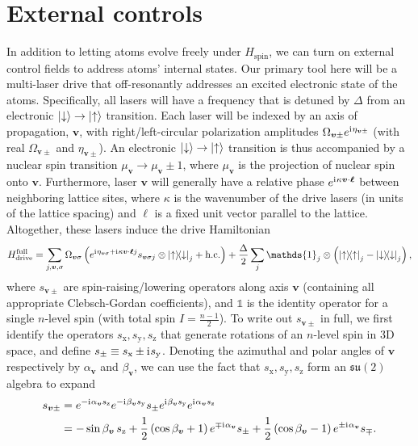 \documentclass[nofootinbib,notitlepage,11pt]{revtex4-2}
\renewcommand{\t}{\text} %
\newcommand{\f}[2]{\dfrac{#1}{#2}} %
\newcommand{\p}[1]{\left(#1\right)} %
\renewcommand{\v}{\bm} %
\renewcommand{\c}{\cdot} %
\renewcommand{\i}{\mathrm{i}\mkern1mu} %
\newcommand{\1}{\mathds{1}}
\newcommand{\up}{\uparrow}
\newcommand{\dn}{\downarrow}
\newcommand{\x}{\text{x}}
\newcommand{\y}{\text{y}}
\newcommand{\z}{\text{z}}
\newcommand{\su}{\mathfrak{su}}
\begin{document}
\section{External controls}
\label{sec:controls}

In addition to letting atoms evolve freely under $H_{\t{spin}}$, we can turn on external control fields to address atoms' internal states.
Our primary tool here will be a multi-laser drive that off-resonantly addresses an excited electronic state of the atoms.
Specifically, all lasers will have a frequency that is detuned by $\Delta$ from an electronic $\ket\dn\to\ket\up$ transition.
Each laser will be indexed by an axis of propagation, $\v v$, with right/left-circular polarization amplitudes $\Omega_{\v v\pm} e^{\i\eta_{\v v\pm}}$ (with real $\Omega_{\v v\pm}$ and $\eta_{\v v\pm}$).
An electronic $\ket\dn\to\ket\up$ transition is thus accompanied by a nuclear spin transition $\mu_{\v v}\to\mu_{\v v}\pm1$, where $\mu_{\v v}$ is the projection of nuclear spin onto $\v v$.
Furthermore, laser $\v v$ will generally have a relative phase $e^{\i\kappa\v v\c\v\ell}$ between neighboring lattice sites, where $\kappa$ is the wavenumber of the drive lasers (in units of the lattice spacing) and $\v\ell$ is a fixed unit vector parallel to the lattice.
Altogether, these lasers induce the drive Hamiltonian
\begin{align}
  H_{\t{drive}}^{\t{full}} = \sum_{j,\v v,\sigma}
  \Omega_{\v v\sigma} \p{e^{\i\eta_{\v v\sigma} + \i\kappa\v v\c\v\ell j}
    s_{\v v\sigma j} \otimes \op{\up}{\dn}_j + \t{h.c.}}
  + \f{\Delta}{2} \sum_j \1_j \otimes\p{\op\up_j-\op\dn_j},
\end{align}
where $s_{\v v\pm}$ are spin-raising/lowering operators along axis $\v v$ (containing all appropriate Clebsch-Gordan coefficients), and $\1$ is the identity operator for a single $n$-level spin (with total spin $I=\frac{n-1}{2}$).
To write out $s_{\v v\pm}$ in full, we first identify the operators $s_\x,s_\y,s_\z$ that generate rotations of an $n$-level spin in 3D space, and define $s_\pm\equiv s_\x\pm\i s_\y$.
Denoting the azimuthal and polar angles of $\v v$ respectively by $\alpha_{\v v}$ and $\beta_{\v v}$, we can use the fact that $s_\x,s_\y,s_\z$ form an $\su(2)$ algebra to expand
\begin{align}
  s_{\v v\pm}
  &= e^{-\i\alpha_{\v v}s_\z} e^{-\i\beta_{\v v}s_\y}
  s_\pm e^{\i\beta_{\v v}s_\y} e^{\i\alpha_{\v v}s_\z} \\
  &= -\sin\beta_{\v v}\, s_\z
  + \f12 \p{\cos\beta_{\v v}+1} e^{\mp\i\alpha_{\v v}} s_\pm
  + \f12 \p{\cos\beta_{\v v}-1} e^{\pm\i\alpha_{\v v}} s_\mp.
\end{align}
\end{document}
